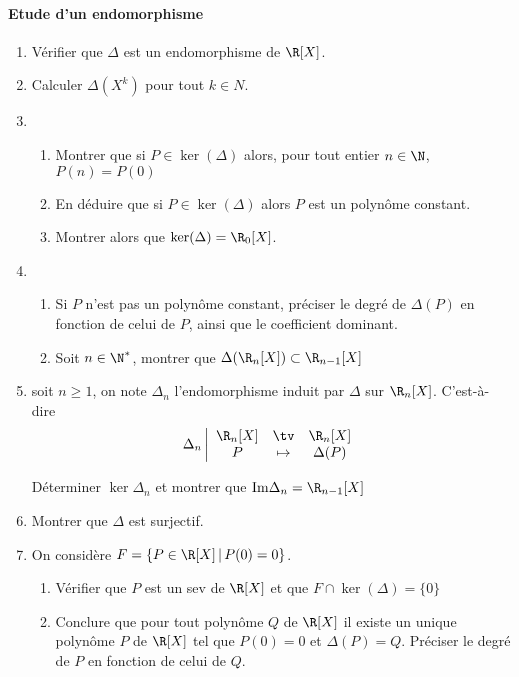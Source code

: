 \paragraph{Etude d'un endomorphisme }
\begin{enumerate}
\item Vérifier que $\Delta$ est un endomorphisme de $\R[X]$. 
\item Calculer $\Delta(X^k)$ pour tout $k\in N$.
\item \begin{enumerate}
\item Montrer que si $P\in \ker(\Delta)$ alors, pour tout entier $n\in \N$, $P(n) = P(0)$ 
\item En déduire que si $P\in \ker(\Delta)$ alors  $P$ est un polynôme constant. 
\item Montrer alors que $\ker(\Delta) = \R_0[X]$.
\end{enumerate}
\item \begin{enumerate}
\item Si $P$ n'est pas un polynôme constant, préciser le degré de $\Delta(P)$ en fonction de celui de $P$, ainsi que le coefficient dominant. 
\item Soit $n\in\N^*$, montrer que $\Delta(\R_{n}[X] ) \subset \R_{n-1} [X]$

\end{enumerate}
\item soit $n\geq 1$, on note $\Delta_n$ l'endomorphisme induit par $\Delta $ sur $\R_n[X]$. C'est-à-dire $$\Delta_n \left|\begin{array}{ccc}
\R_n[X] & \tv & \R_n[X]\\
P &\mapsto  & \Delta(P)
\end{array}\right.$$

Déterminer $\ker \Delta_n$ et montrer que $\mathrm{Im} \Delta_n = \R_{n-1} [X]$
\item Montrer que $\Delta$ est surjectif. 
\item On considère $F =\{ P \in \R[X] \, |\, P(0)=0\} $.
\begin{enumerate}
\item Vérifier que $P$ est un sev de $\R[X] $ et que $F\cap \ker(\Delta) = \{ 0\} $
\item Conclure que pour tout polynôme $Q$ de $\R[X]$ il existe un unique polynôme $P$ de $\R[X]$ tel que $P(0)=0$ et $\Delta(P)= Q$. Préciser le degré de $P$ en fonction de celui de $Q$. 
\end{enumerate}
\end{enumerate}

